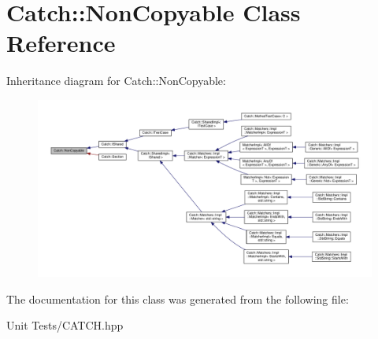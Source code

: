 \hypertarget{classCatch_1_1NonCopyable}{}\section{Catch\+:\+:Non\+Copyable Class Reference}
\label{classCatch_1_1NonCopyable}


Inheritance diagram for Catch\+:\+:Non\+Copyable\+:
\nopagebreak
\begin{figure}[H]
\begin{center}
\leavevmode
\includegraphics[width=350pt]{classCatch_1_1NonCopyable__inherit__graph}
\end{center}
\end{figure}


The documentation for this class was generated from the following file\+:\begin{DoxyCompactItemize}
\item 
Unit Tests/C\+A\+T\+C\+H.\+hpp\end{DoxyCompactItemize}
